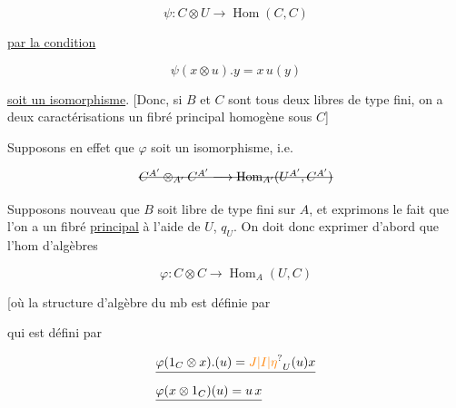 \[
\psi:C\otimes U\longrightarrow\operatorname{Hom}(C,C)\tag*{$(**)$}
\]

\uline{par la condition}

\[
\boxed{\psi(x\otimes u).y=x\,u(y)}
\]


\uline{soit un isomorphisme}. [Donc, si $B$ et $C$ sont tous deux libres de type fini, on a deux caractérisations     un fibré principal homogène sous $C$]

Supposons en effet que $\varphi$ soit un isomorphisme, i.e. 

\[
\deleted{C^{A'}\otimes_{A'}C^{A'}\longrightarrow\operatorname{Hom}_{A'}(U^{A'},C^{A'})}
\]



Supposons   nouveau que $B$ soit libre de type fini sur $A$,  et exprimons le fait que  l'on a un fibré \uline{principal}  à l'aide de $U$, $q_U$. On doit donc exprimer d'abord que l'hom d'algèbres

\[
\varphi:C\otimes C\longrightarrow\operatorname{Hom}_A(U,C)
\]

[où la structure d'algèbre du  mb est définie par

\diagram{\begin{tikzcd}[ampersand replacement=\&]
U\arrow[r,"{\unsure{\Delta_U|\check{\Delta}_U}}"]\arrow[rrr,bend right=15,"{v*w}"'] \& U\otimes U\arrow[r,"{v\otimes w}"]\& C\otimes C\arrow[r,"{\Delta_C}"]\& C\quad{]}
\end{tikzcd}}

qui est défini par

\[
\begin{aligned}
&\deleted{\varphi(1_C\otimes x).(u)=\unsure{J|I|\eta}_U(u)x}\\
&\deleted{\varphi(x\otimes1_C)(u)=u\,x}
\end{aligned}
\]

